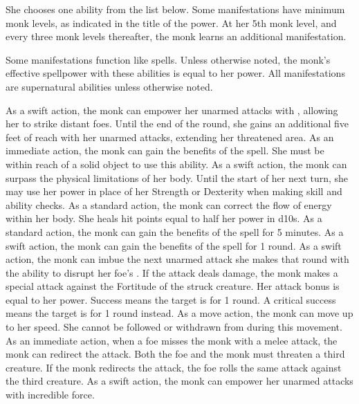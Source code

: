 She chooses one ability from the list below.
Some \ki manifestations have minimum monk levels, as indicated in the title of the power.
At her 5th monk level, and every three monk levels thereafter, the monk learns an additional \ki manifestation.

Some \ki manifestations function like spells.
Unless otherwise noted, the monk's effective spellpower with these abilities is equal to her \ki power.
All \ki manifestations are supernatural abilities unless otherwise noted.

As a swift action, the monk can empower her unarmed attacks with \ki, allowing her to strike distant foes.
Until the end of the round, she gains an additional five feet of reach with her unarmed attacks, extending her threatened area.
As an immediate action, the monk can gain the benefits of the  spell.
She must be within reach of a solid object to use this ability.
As a swift action, the monk can surpass the physical limitations of her body.
Until the start of her next turn, she may use her \ki power in place of her Strength or Dexterity when making skill and ability checks.
As a standard action, the monk can correct the flow of energy within her body.
She heals hit points equal to half her \ki power in d10s.
As a standard action, the monk can gain the benefits of the  spell for 5 minutes.
As a swift action, the monk can gain the benefits of the  spell for 1 round.
As a swift action, the monk can imbue the next unarmed attack she makes that round with the ability to disrupt her foe's \ki.
If the attack deals damage, the monk makes a special attack against the Fortitude of the struck creature.
Her attack bonus is equal to her \ki power.
Success means the target is \staggered for 1 round.
A critical success means the target is \stunned for 1 round instead.
\norepeatnotes
{}
As a move action, the monk can move up to her speed.
She cannot be followed or withdrawn from during this movement.
As an immediate action, when a foe misses the monk with a melee attack, the monk can redirect the attack.
Both the foe and the monk must threaten a third creature.
If the monk redirects the attack, the foe rolls the same attack against the third creature.
As a swift action, the monk can empower her unarmed attacks with incredible force.
